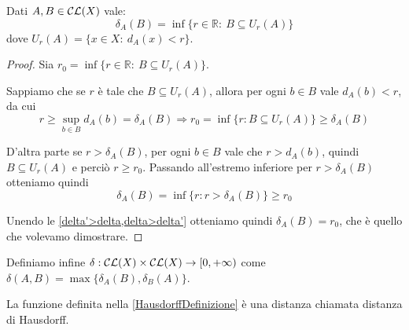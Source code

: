 \begin{lemma}\label{EquivalenzaAllargamento}
	Dati $A,B\in \mathcal{CL}(X)$ vale:
	\begin{equation*}
		\delta_A(B)=\inf\{r\in\mathbb{R}:\ B\subseteq U_r(A)\}
	\end{equation*}
	dove $U_r(A)=\{x\in X :\ d_A(x)<r \}$.
\end{lemma}
\begin{proof}
	Sia $r_0=\inf\{r\in\mathbb{R}:\ B\subseteq U_r(A)\}$.
	
	Sappiamo che se $r$ è tale che $B\subseteq U_r(A)$, allora per ogni $b\in B$ vale $d_A(b)<r$, da cui
	\begin{equation}\label{delta'>delta}
		r\ge \sup_{b\in B} d_A(b)=\delta_A(B) \Longrightarrow r_0=\inf\{r:B\subseteq U_r(A) \}\ge \delta_A(B)
	\end{equation}
	
	D'altra parte se $r>\delta_A(B)$, per ogni $b\in B$ vale che $r>d_A(b)$, quindi $B\subseteq U_r(A)$ e perciò $r\ge r_0$. Passando all'estremo inferiore per $r>\delta_A(B)$ otteniamo quindi
	\begin{equation}\label{delta>delta'}
		\delta_A(B)=\inf\{r:r>\delta_A(B)\}\ge r_0
	\end{equation}
	
	Unendo le \cref{delta'>delta,delta>delta'} otteniamo quindi $\delta_A(B)=r_0$, che è quello che volevamo dimostrare.
\end{proof}




\begin{definition}\label{HausdorffDefinizione}
	Definiamo infine $\delta:\mathcal{CL}(X)\times \mathcal{CL}(X) \to [0,+\infty)$ come $\delta(A,B)=\max\{ \delta_A(B),\delta_B(A) \}$.
\end{definition}

\begin{theorem}
	La funzione definita nella \cref{HausdorffDefinizione} è una distanza chiamata distanza di Hausdorff.
\end{theorem}

